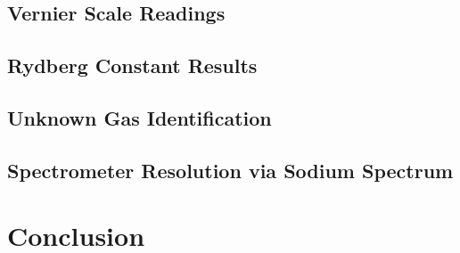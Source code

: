 \documentclass{article} %
\begin{document}
\begin{multicols}{2}
\subsection{Vernier Scale Readings}

\subsection{Rydberg Constant Results}

\subsection{Unknown Gas Identification}

\subsection{Spectrometer Resolution via Sodium Spectrum}

\section{Conclusion}

\label{last_page}

\newpage



\end{multicols}
\end{document}
